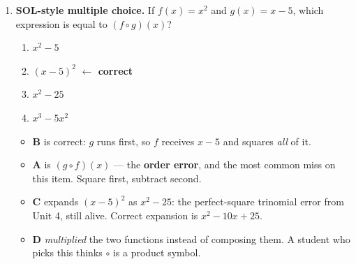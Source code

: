 \documentclass[10pt]{article}
\begin{document}
\begin{enumerate}[leftmargin=1.8em, itemsep=10pt]
  \item \textbf{SOL-style multiple choice.} If $f(x)=x^{2}$ and $g(x)=x-5$, which expression is
        equal to $(f\circ g)(x)$?
        \begin{enumerate}[label=\Alph*., leftmargin=1.9em, itemsep=1pt]
          \item $x^{2}-5$
          \item $(x-5)^{2}$ \quad \textcolor{keyred}{\textbf{$\leftarrow$ correct}}
          \item $x^{2}-25$
          \item $x^{3}-5x^{2}$
        \end{enumerate}
        \vspace{2pt}
        \begin{itemize}[leftmargin=1.4em, nosep]
          \item \textbf{B} is correct: $g$ runs first, so $f$ receives $x-5$ and squares
                \emph{all} of it.
          \item \textbf{A} is $(g\circ f)(x)$ --- the \textbf{order error}, and the most common miss
                on this item. Square first, subtract second.
          \item \textbf{C} expands $(x-5)^{2}$ as $x^{2}-25$: the perfect-square trinomial error from
                Unit 4, still alive. Correct expansion is $x^{2}-10x+25$.
          \item \textbf{D} \emph{multiplied} the two functions instead of composing them. A student
                who picks this thinks $\circ$ is a product symbol.
        \end{itemize}
\end{enumerate}
\end{document}
